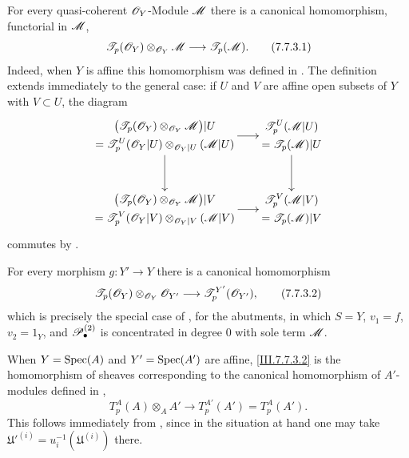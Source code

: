 \begin{env}[7.7.3]
\label{III.7.7.3}
For every quasi-coherent $\mathscr{O}_Y$-Module $\mathscr{M}$ there is
a canonical homomorphism, functorial in $\mathscr{M}$,
\[
  \mathscr{T}_p(\mathscr{O}_Y)
  \otimes_{\mathscr{O}_Y}\mathscr{M}
  \longrightarrow
  \mathscr{T}_p(\mathscr{M}).
  \tag{7.7.3.1}\label{III.7.7.3.1}
\]
Indeed, when $Y$ is affine this homomorphism was defined in
.  The definition extends immediately to
the general case: if $U$ and $V$ are affine open subsets of
$Y$ with $V\subset U$, the diagram
\[
\xymatrix@C=18pt@R=32pt{
  {\begin{gathered}
    \bigl(\sh{T}_p(\sh{O}_Y)
      \otimes_{\sh{O}_Y}\sh{M}\bigr)|U\\
    =
    \sh{T}^U_p(\sh{O}_Y|U)
      \otimes_{\sh{O}_Y|U}(\sh{M}|U)
  \end{gathered}}
  \ar[r]\ar[d]
  &
  {\begin{gathered}
    \sh{T}^U_p(\sh{M}|U)\\
    =\sh{T}_p(\sh{M})|U
  \end{gathered}}
  \ar[d]
  \\
  {\begin{gathered}
    \bigl(\sh{T}_p(\sh{O}_Y)
      \otimes_{\sh{O}_Y}\sh{M}\bigr)|V\\
    =
    \sh{T}^V_p(\sh{O}_Y|V)
      \otimes_{\sh{O}_Y|V}(\sh{M}|V)
  \end{gathered}}
  \ar[r]
  &
  {\begin{gathered}
    \sh{T}^V_p(\sh{M}|V)\\
    =\sh{T}_p(\sh{M})|V
  \end{gathered}}
}
\]
commutes by .

For every morphism $g:Y'\to Y$ there is a canonical
homomorphism
\[
  \mathscr{T}_p(\mathscr{O}_Y)
  \otimes_{\mathscr{O}_Y}\mathscr{O}_{Y'}
  \longrightarrow
  \mathscr{T}^{Y'}_p(\mathscr{O}_{Y'}),
  \tag{7.7.3.2}\label{III.7.7.3.2}
\]
which is precisely the special case of
, for the abutments, in which
$S=Y$, $v_1=f$, $v_2=1_Y$, and
$\mathscr{P}^{(2)}_\bullet$ is concentrated in degree $0$ with
sole term $\mathscr{M}$.

When $Y=\operatorname{Spec}(A)$ and $Y'=\operatorname{Spec}(A')$ are affine,
\eqref{III.7.7.3.2} is the homomorphism of sheaves
corresponding to the canonical homomorphism of $A'$-modules
defined in ,
\[
  T^A_p(A)\otimes_A A'
  \longrightarrow
  T^{A'}_p(A')
  =
  T^A_p(A').
\]
This follows immediately from , since in
the situation at hand one may take
$\mathfrak U'^{(i)}=u_i^{-1}(\mathfrak U^{(i)})$ there.
\end{env}

